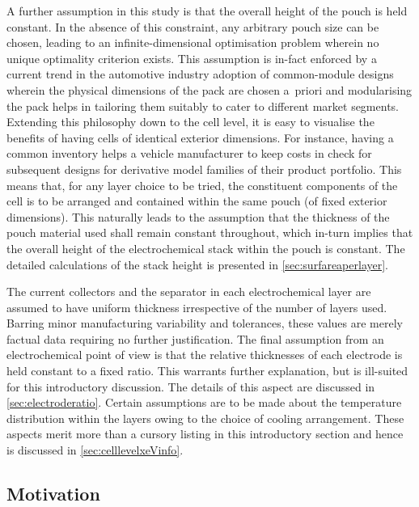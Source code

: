 A further assumption  in this study is  that the overall height of  the pouch is
held constant. In  the absence of this constraint, any  arbitrary pouch size can
be chosen,  leading to an  infinite-dimensional optimisation problem  wherein no
unique optimality  criterion exists.  This assumption is  in-fact enforced  by a
current  trend  in the  automotive  industry  \viz{} adoption  of  common-module
designs wherein  the physical  dimensions of  the pack  are chosen  a~priori and
modularising the  pack helps in  tailoring them  suitably to cater  to different
market segments. Extending this philosophy down to the cell level, it is easy to
visualise the  benefits of  having cells of  identical exterior  dimensions. For
instance, having a  common inventory helps a vehicle manufacturer  to keep costs
in check  for subsequent designs  \eg{} for  derivative model families  of their
product  portfolio. This  means that,  for  any layer  choice to  be tried,  the
constituent components  of the cell is  to be arranged and  contained within the
same  pouch  (of  fixed  exterior  dimensions).  This  naturally  leads  to  the
assumption that the  thickness of the pouch material used  shall remain constant
throughout, which in-turn implies that the overall height of the electrochemical
stack  within the  pouch is  constant. The  detailed calculations  of the  stack
height is presented in \cref{sec:surfareaperlayer}.

The  current collectors  and the  separator  in each  electrochemical layer  are
assumed to  have uniform thickness  irrespective of  the number of  layers used.
Barring minor manufacturing variability and  tolerances, these values are merely
factual data  requiring no further  justification. The final assumption  from an
electrochemical point of view is that the relative thicknesses of each electrode
is held  constant to a  fixed ratio. This  warrants further explanation,  but is
ill-suited  for this  introductory discussion.  The details  of this  aspect are
discussed  in  \cref{sec:electroderatio}. Certain  assumptions  are  to be  made
about the  temperature distribution  within the  layers owing  to the  choice of
cooling arrangement.  These aspects merit  more than  a cursory listing  in this
introductory section and hence is discussed in \cref{sec:celllevelxeVinfo}.

\subsection{Motivation}\label{subsec:layeroptmotivation}

